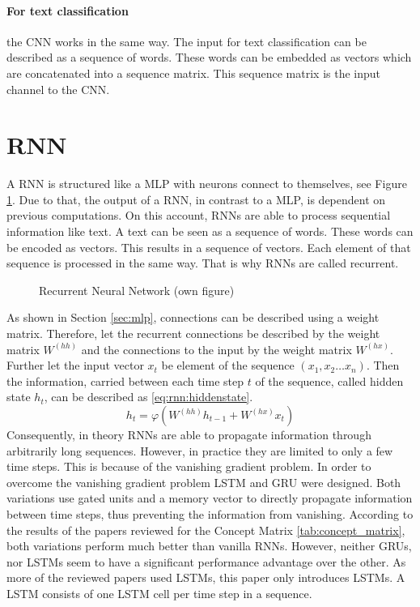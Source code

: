 	\paragraph{For text classification} the \ac{CNN} works in the same way. The input for text classification can be described as a sequence of words. These words can be embedded as vectors which are concatenated into a sequence matrix. This sequence matrix is the input channel to the \ac{CNN}.\autocite{Kim.2014}
		
	\section{\ac{RNN}}
		A \ac{RNN} is structured like a \ac{MLP} with neurons connect to themselves, see Figure \ref{img:rnn}. \autocite{Elman.1990} Due to that, the output of a \ac{RNN}, in contrast to a \ac{MLP}, is dependent on previous computations. On this account, \ac{RNN}s are able to process sequential information like text. A text can be seen as a sequence of words. These words can be encoded as vectors. \autocites{Wang.2012}{Turian.2010}{Mikolov.2013}{Mikolov.2013b}{Joulin.2016}{Smith.2019}{Pennington.2014}{McCann.2017} This results in a sequence of vectors. Each element of that sequence is processed in the same way. That is why \ac{RNN}s are called recurrent. 
		\begin{figure}[H]
			\centering
			
			\caption{Recurrent Neural Network (own figure)} \label{img:rnn}
		\end{figure}
		As shown in Section \ref{sec:mlp}, connections can be described using a weight matrix. Therefore, let the recurrent connections be described by the weight matrix $W^{(hh)}$ and the connections to the input by the weight matrix $W^{(hx)}$. Further let the input vector $x_t$ be element of the  sequence $(x_1, x_2 \dots x_n)$. Then the information, carried between each time step $t$ of the sequence, called hidden state $h_t$, can be described as \eqref{eq:rnn:hiddenstate}.
		\begin{equation}
			h_t = \varphi(W^{(hh)}h_{t-1}+W^{(hx)}x_t)
			\label{eq:rnn:hiddenstate}
		\end{equation}
		Consequently, in theory \ac{RNN}s are able to propagate information through arbitrarily long sequences. However, in practice they are limited to only a few time steps. This is because of the vanishing gradient problem. \autocite{Hochreiter.2001} In order to overcome the vanishing gradient problem \ac{LSTM} \autocite{Hochreiter.1997} and \ac{GRU} \autocite{Cho.2014} were designed. Both variations use gated units and a memory vector to directly propagate information between time steps, thus preventing the information from vanishing. \autocite{Hochreiter.2001} According to the results of the papers reviewed for the Concept Matrix \ref{tab:concept_matrix}, both variations perform much better than vanilla \ac{RNN}s. However, neither \ac{GRU}s, nor \ac{LSTM}s seem to have a significant performance advantage over the other.\autocites{Greff.2015}{Shah.2015} As more of the reviewed papers used \ac{LSTM}s, this paper only introduces \ac{LSTM}s. A \ac{LSTM} consists of one \ac{LSTM} cell per time step in a sequence.
